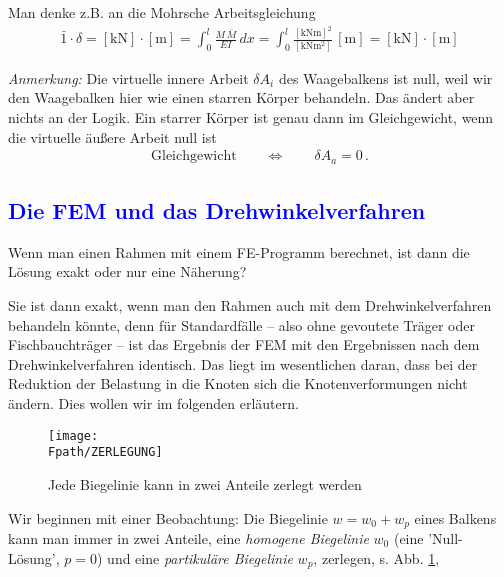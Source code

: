 {{Man denke z.B. an die Mohrsche Arbeitsgleichung
\begin{align}
\bar{1} \cdot \delta = [\text{kN}] \cdot [\text{m}] = \int_{0}^{l}\frac{M\,\bar{M}}{EI}\,dx = \int_{0}^{l} \frac{[\text{kNm}]^2}{[\text{kNm$^2$}]}\,[\text{m}] = [\text{kN}]\cdot [\text{m}]
\end{align}



{\small {\em Anmerkung:} Die virtuelle innere Arbeit $\delta A_i$ des Waagebalkens ist
null, weil wir den Waagebalken hier wie einen starren K\"{o}rper behandeln. Das \"{a}ndert aber
nichts an der Logik. Ein starrer K\"{o}rper ist genau dann im Gleichgewicht, wenn die
virtuelle \"{a}u{\ss}ere Arbeit null ist
\begin{align}
 \mbox{Gleichgewicht} \qquad \Longleftrightarrow \qquad  \delta
A_a =  0\,.
\end{align}
}%


{\textcolor{blue}{\section{Die FEM und das Drehwinkelverfahren}}}
\glqq Wenn man einen Rahmen mit einem FE-Programm berechnet, ist
dann die L\"{o}sung exakt oder nur eine N\"{a}herung?\grqq

Sie ist dann exakt, wenn man den Rahmen auch mit dem Drehwinkelverfahren behandeln
k\"{o}nnte, denn f\"{u}r Standardf\"{a}lle -- also ohne gevoutete Tr\"{a}ger oder Fischbauchtr\"{a}ger -- ist
das Ergebnis der FEM mit den Ergebnissen nach dem Drehwinkelverfahren identisch. Das
liegt im wesentlichen daran, dass bei der Reduktion der Belastung in die Knoten sich die
Knotenverformungen nicht \"{a}ndern. Dies wollen wir im folgenden erl\"{a}utern.
\begin{figure}[tbp] \centering
\if {} \sidecaption \fi
\texttt{[image: \\Fpath/ZERLEGUNG]}
\caption{Jede Biegelinie kann in zwei Anteile zerlegt werden}
\label{Zerlegung}%
\end{figure}%

Wir beginnen mit einer Beobachtung: Die Biegelinie $w = w_0 + w_p$ eines Balkens kann
man immer in zwei Anteile, eine {\em homogene Biegelinie} $w_0$ (eine 'Null-L\"{o}sung', $p  = 0$) und eine {\em partikul\"{a}re Biegelinie} $w_p$, zerlegen, s. Abb. \ref{Zerlegung},\\

}}
